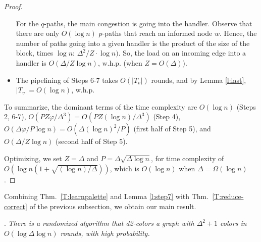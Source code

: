 \begin{proof}
\begin{itemize}
For the $q$-paths, the main congestion is going into the handler. Observe that there are only $O(\log n)$ $p$-paths that reach an informed node $w$. Hence, the number of paths going into a given handler is the product of the size of the block, times $\log n$: $\Delta^2/Z \cdot \log n)$. So, the load on an incoming edge into a handler is $O(\Delta/Z \log n)$, w.h.p. (when $Z = O(\Delta)$).

\item The pipelining of Steps 6-7 takes $O(|T_v|)$ rounds, and by Lemma \ref{l:last}, $|T_v| = O(\log n)$, w.h.p. 

\end{itemize}

To summarize, the dominant terms of the time complexity are $O(\log n)$ (Steps 2, 6-7), $O(PZ\varphi/\Delta^3) = O(PZ (\log n)/\Delta^3)$ (Step 4), $O(\Delta\varphi/P \log n) = O(\Delta(\log n)^2/P)$ (first half of Step 5), and $O(\Delta/Z \log n)$ (second half of Step 5).

Optimizing, we set $Z = \Delta$ and $P = \Delta \sqrt{\Delta\log n}$, 
for time complexity of $O(\log n (1 + \sqrt{(\log n)/\Delta}))$, which is $O(\log n)$ when $\Delta = \Omega(\log n)$. 
\end{proof}
\fi %



Combining Thm.~\ref{T:learnpalette} and Lemma \ref{l:step7} with
Thm.~\ref{T:reduce-correct} of the previous subsection,
we obtain our main result.

\smallskip
\textsc{.} 
\emph{There is a randomized \CONGEST algorithm that d2-colors a graph with $\Delta^2+1$ colors in $O(\log \Delta \log n)$ rounds, with high probability.}
